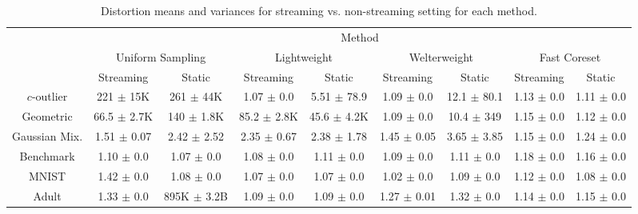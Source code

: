\begin{table*}
    \centering
    \tiny
    \begin{tabular}{|c|cc|cc|cc|cc|}
        \hline
        & \multicolumn{8}{c|}{Method} \\
        \cline{2-9} & \multicolumn{2}{c|}{Uniform Sampling} & \multicolumn{2}{c|}{Lightweight} & \multicolumn{2}{c|}{Welterweight} & \multicolumn{2}{c|}{Fast Coreset} \\
        & Streaming & Static & Streaming & Static & Streaming & Static & Streaming & Static \\
        \cline{2-9}
        $c$-outlier & 221 $\pm$ 15K & 261 $\pm$ 44K & 1.07 $\pm$ 0.0 & 5.51 $\pm$ 78.9 & 1.09 $\pm$ 0.0 & 12.1 $\pm$ 80.1 & 1.13 $\pm$ 0.0 & 1.11 $\pm$
        0.0 \\
        Geometric & 66.5 $\pm$ 2.7K & 140 $\pm$ 1.8K & 85.2 $\pm$ 2.8K & 45.6 $\pm$ 4.2K & 1.09 $\pm$ 0.0 & 10.4 $\pm$ 349 & 1.15 $\pm$ 0.0 & 1.12 $\pm$ 0.0 \\
        Gaussian Mix. & 1.51 $\pm$ 0.07 & 2.42 $\pm$ 2.52 & 2.35 $\pm$ 0.67 & 2.38 $\pm$ 1.78 & 1.45 $\pm$ 0.05 & 3.65 $\pm$ 3.85 & 1.15 $\pm$ 0.0 & 1.24 $\pm$
        0.0 \\
        Benchmark & 1.10 $\pm$ 0.0 & 1.07 $\pm$ 0.0 & 1.08 $\pm$ 0.0 & 1.11 $\pm$ 0.0 & 1.09 $\pm$ 0.0 & 1.11 $\pm$ 0.0 & 1.18 $\pm$ 0.0 & 1.16 $\pm$ 0.0 \\
        MNIST & 1.42 $\pm$ 0.0 & 1.08 $\pm$ 0.0 & 1.07 $\pm$ 0.0 & 1.07 $\pm$ 0.0 & 1.02 $\pm$ 0.0 & 1.09 $\pm$ 0.0 & 1.12 $\pm$ 0.0 & 1.08 $\pm$ 0.0 \\
        Adult & 1.33 $\pm$ 0.0 & 895K $\pm$ 3.2B & 1.09 $\pm$ 0.0 & 1.09 $\pm$ 0.0 & 1.27 $\pm$ 0.01 & 1.32 $\pm$ 0.0 & 1.14 $\pm$ 0.0 & 1.15 $\pm$ 0.0 \\
        \hline
    \end{tabular}
    \caption{Distortion means and variances for streaming vs. non-streaming setting for each method.}
    \label{tbl:composition}
\end{table*}

